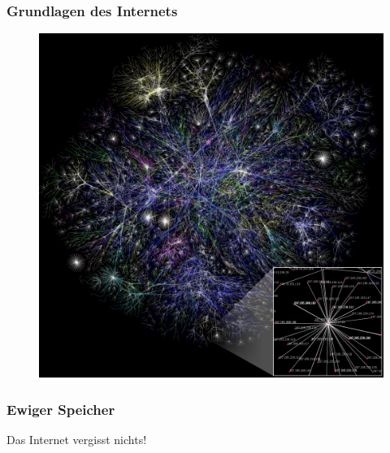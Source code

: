 \documentclass[12pt]{beamer}
\begin{document}
\begin{frame}
  \frametitle{Grundlagen des Internets}
  \begin{figure}
    \includegraphics[height=0.85\textheight]{img/internet_map.jpg}
  \end{figure}
\end{frame}

\begin{frame}
  \frametitle{Ewiger Speicher}
  \begin{center} \Large
   Das Internet vergisst nichts!\\
  \end{center}
\end{frame}
\end{document}
